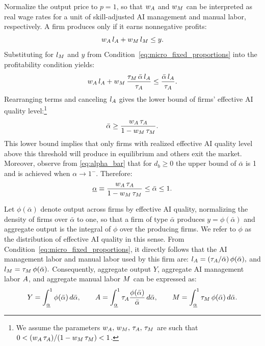 Normalize the output price to $p=1$, so that $w_{A}$ and $w_{M}$ can be interpreted as real wage rates for a unit of skill-adjusted AI management and manual labor, respectively.
A firm produces only if it earns nonnegative profits:
\[
w_{A}\,l_{A}+w_{M}\,l_{M}\leq y.
\]
Substituting for $l_{M}$ and $y$ from Condition~\eqref{eq:micro_fixed_proportions} into the profitability condition yields:
\[
w_{A}\,l_{A}+w_{M}\,\frac{\tau_{M}\,\bar{\alpha}\,l_{A}}{\tau_{A}} \leq \frac{\bar{\alpha}\,l_{A}}{\tau_{A}}.
\]
Rearranging terms and canceling $l_{A}$ gives the lower bound of firms' effective AI quality level:\footnote{We assume the parameters $w_{A},\,w_{M},\,\tau_{A},\,\tau_{M}$ are such that $0 < ({w_{A}\,\tau_{A}})/(1-w_{M}\,\tau_{M}) < 1$.}
\[
\bar{\alpha} \geq \frac{w_{A}\,\tau_{A}}{1 - w_{M}\,\tau_{M}}.
\]
This lower bound implies that only firms with realized effective AI quality level above this threshold will produce in equilibrium and others exit the market.
Moreover, observe from \eqref{eq:alpha_bar} that for $d_b \geq 0$ the upper bound of $\bar{\alpha}$ is 1 and is achieved when $\alpha \rightarrow 1^{-}$.
Therefore:
\begin{equation}
\underline{\alpha} \equiv \frac{w_{A}\,\tau_{A}}{1 - w_{M}\,\tau_{M}} \leq \bar{\alpha} \leq 1.
\label{eq:alpha_threshold}
\end{equation}

Let $\phi(\bar{\alpha})$ denote output across firms by effective AI quality, normalizing the density of firms over $\bar{\alpha}$ to one, so that a firm of type $\bar{\alpha}$ produces $y = \phi(\bar{\alpha})$ and aggregate output is the integral of $\phi$ over the producing firms.
We refer to $\phi$ as the distribution of effective AI quality in this sense.
From Condition~\eqref{eq:micro_fixed_proportions}, it directly follows that the AI management labor and manual labor used by this firm are: $l_{A} = (\tau_{A}/\bar{\alpha})\,\phi(\bar{\alpha}),$ and $l_{M} = \tau_{M}\,\phi(\bar{\alpha}).$
Consequently, aggregate output $Y$, aggregate AI management labor $A$, and aggregate manual labor $M$ can be expressed as:
\begin{equation}
Y = \int_{\underline{\alpha}}^{1}\phi(\bar{\alpha})\,d\bar{\alpha}, \qquad
A = \int_{\underline{\alpha}}^{1}\tau_{A}\frac{\phi(\bar{\alpha})}{\bar{\alpha}}\,d\bar{\alpha}, \qquad
M = \int_{\underline{\alpha}}^{1}\tau_{M}\,\phi(\bar{\alpha})\,d\bar{\alpha}.
\label{eq:micro_Y}
\end{equation}

